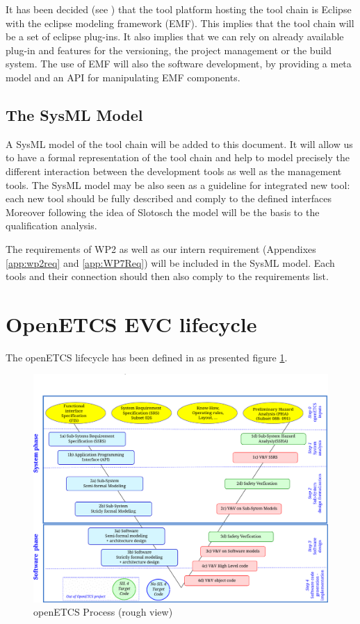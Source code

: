 It has been decided (see \cite{D7.1}) that the tool platform hosting
the tool chain is Eclipse with the eclipse modeling framework
(\gls{EMF}).
This implies that the tool chain will be a set of eclipse
plug-ins. It also implies that we can rely on already
available plug-in and features for the versioning, the project
management or the build system.  The use of EMF will also the software
development, by providing a meta model and an \gls{API} for
manipulating EMF components. 


\subsection{The SysML Model}
A SysML model of the tool chain will be added to this document. It
will allow us to have a formal representation of the tool chain and
help to model precisely the different interaction between the
development tools as well as the management tools.  The SysML model
may be also seen as a guideline for integrated new tool: each new tool
should be fully described and comply to the defined interfaces
Moreover following the idea of Slotosch \cite{slotosch_iso_2012} the
model will be the basis to the qualification analysis.

The requirements of WP2 \cite{baro_requirements_2013} as well as our
intern requirement (Appendixes \ref{app:wp2req} and \ref{app:WP7Req})
will be included in the SysML model. Each tools and their connection
should then also comply to the requirements list.

\section{OpenETCS \gls{EVC} lifecycle}
The openETCS lifecycle has been defined in 
 \cite{D2.3} as  presented figure \ref{fig:openETCSProcess}.
\begin{figure}[htbp]
  \centering
  \includegraphics[width= \textwidth]{images/ProcessOpenETCS}
  \caption{openETCS Process (rough view)}
  \label{fig:openETCSProcess}
\end{figure}

